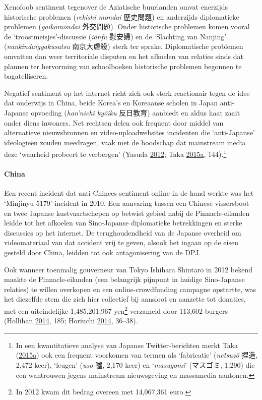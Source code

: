 \documentclass[10.5pt,dutch,]{article}
\let\oldparagraph\paragraph
\renewcommand{\paragraph}[1]{\oldparagraph{#1}\mbox{}}
\begin{document}
Xenofoob sentiment tegenover de Aziatische buurlanden omvat enerzijds
historische problemen (\emph{rekishi mondai} 歴史問題) en anderzijds
diplomatieke problemen (\emph{gaikōmondai} 外交問題). Onder historische
problemen komen vooral de `troostmeisjes'-discussie (\emph{ianfu}
慰安婦) en de `Slachting van Nanjing' (\emph{nankindaigyakusatsu}
南京大虐殺) sterk ter sprake. Diplomatische problemen omvatten dan weer
territoriale disputen en het afkoelen van relaties sinds dat plannen ter
hervorming van schoolboeken historische problemen begonnen te
bagatelliseren.

Negatief sentiment op het internet richt zich ook sterk reactionair
tegen de idee dat onderwijs in China, beide Korea's en Koreaanse scholen
in Japan anti-Japanse opvoeding (\emph{han'nichi kyōiku} 反日教育)
aanbiedt en aldus haat zaait onder diens inwoners. Net rechtsen delen
ook frequent door middel van alternatieve nieuwsbronnen en
video-uploadwebsites incidenten die `anti-Japanse' ideologieën zouden
meedragen, vaak met de boodschap dat mainstream media deze `waarheid
probeert te verbergen' (Yasuda
\protect\hyperlink{ref-yasudaux5fnettoux5f2012}{2012}; Taka
\protect\hyperlink{ref-takaux5ftwitterux5f2015-1}{2015}\protect\hyperlink{ref-takaux5ftwitterux5f2015-1}{a},
144).\footnote{In een kwantitatieve analyse van Japanse
  Twitter-berichten merkt Taka
  (\protect\hyperlink{ref-takaux5ftwitterux5f2015-1}{2015}\protect\hyperlink{ref-takaux5ftwitterux5f2015-1}{a})
  ook een frequent voorkomen van termen als `fabricatie' (\emph{netsuzō}
  捏造, 2,472 keer), `leugen' (\emph{uso} 噓, 2,170 keer) en
  `\emph{masugomi}' (マスゴミ, 1,290) die een wantrouwen jegens
  mainstream nieuwsgeving en massamedia aantonen.}

\paragraph{China}\label{china}

Een recent incident dat anti-Chinees sentiment online in de hand werkte
was het `Minjinyu 5179'-incident in 2010. Een aanvaring tussen een
Chinese vissersboot en twee Japanse kustvaartschepen op betwist gebied
nabij de Pinnacle-eilanden leidde tot het afkoelen van Sino-Japanse
diplomatieke betrekkingen en sterke discussies op het internet. De
terughoudendheid van de Japanse overheid om videomateriaal van dat
accident vrij te geven, alsook het ingaan op de eisen gesteld door
China, leidden tot ook antagonisering van de DPJ.

Ook wanneer toenmalig gouverneur van Tokyo Ishihara Shintarō in 2012
bekend maakte de Pinnacle-eilanden (een belangrijk pijnpunt in huidige
Sino-Japanse relaties) te willen overkopen en een online-crowdfunding
campagne opstartte, was het diezelfde stem die zich hier collectief bij
aansloot en aanzette tot donaties, met een uiteindelijke 1,485,201,967
yen\footnote{In 2012 kwam dit bedrag overeen met 14,067,361 euro.}
verzameld door 113,602 burgers (Hollihan
\protect\hyperlink{ref-hollihanux5fdisputeux5f2014}{2014}, 185; Horiuchi
\protect\hyperlink{ref-horiuchiux5fpublicux5f2014}{2014}, 36--38).
\end{document}
